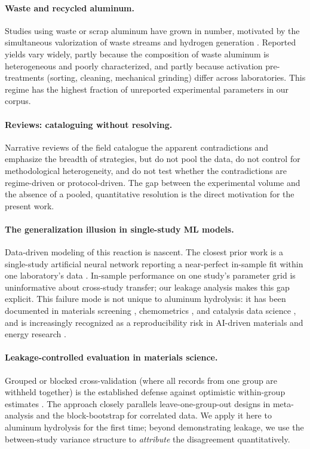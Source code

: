 \paragraph{Waste and recycled aluminum.}
Studies using waste or scrap aluminum have grown in number, motivated by the
simultaneous valorization of waste streams and hydrogen generation
\citep{gupta2025,ho2016,knoks2025,mezulis2023,martinezv2026,buryakov2023met,urbonav2024,fadhilah2023}.
Reported yields vary widely, partly because the composition of waste aluminum is
heterogeneous and poorly characterized, and partly because activation pre-treatments
(sorting, cleaning, mechanical grinding) differ across laboratories. This regime has the
highest fraction of unreported experimental parameters in our corpus.

\paragraph{Reviews: cataloguing without resolving.}
Narrative reviews of the field
\citep{musicco2025,dupreez2021review} catalogue the apparent contradictions and
emphasize the breadth of strategies, but do not pool the data, do not control for
methodological heterogeneity, and do not test whether the contradictions are regime-driven
or protocol-driven. The gap between the experimental volume and the absence of a pooled,
quantitative resolution is the direct motivation for the present work.

\paragraph{The generalization illusion in single-study ML models.}
Data-driven modeling of this reaction is nascent. The closest prior work is a single-study
artificial neural network reporting a near-perfect in-sample fit within one laboratory's
data \citep{das2023fuel}. In-sample performance on one study's parameter grid is
uninformative about cross-study transfer; our leakage analysis makes this gap explicit.
This failure mode is not unique to aluminum hydrolysis: it has been documented in materials
screening \citep{bernett2024,john2025}, chemometrics \citep{pomerantsev2021}, and catalysis
data science \citep{suvarna2024}, and is increasingly recognized as a reproducibility risk
in AI-driven materials and energy research \citep{bozalginesta2025,coelho2022,xue2024,noble2022}.

\paragraph{Leakage-controlled evaluation in materials science.}
Grouped or blocked cross-validation (where all records from one group are withheld
together) is the established defense against optimistic within-group estimates
\citep{bernett2024,john2025}. The approach closely parallels leave-one-group-out designs
in meta-analysis and the block-bootstrap for correlated data. We apply it here to
aluminum hydrolysis for the first time; beyond demonstrating leakage, we use the
between-study variance structure to \emph{attribute} the disagreement quantitatively.

